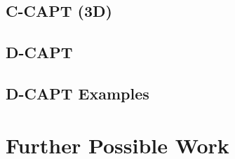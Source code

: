 \documentclass[11pt]{article}
\begin{document}
\subsection{C-CAPT (3D)}
\subsection{D-CAPT}

\subsection{D-CAPT Examples}




\section{Further Possible Work}
\end{document}
